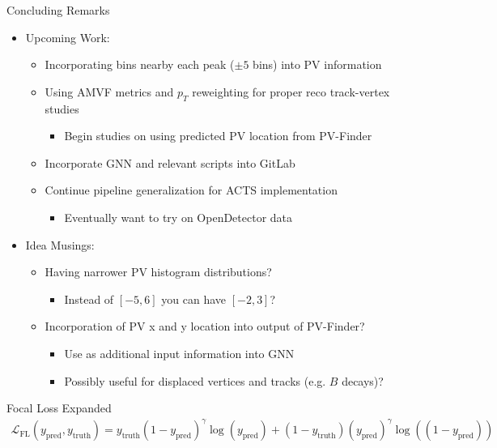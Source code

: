 \documentclass[xcolor=table,aspectratio=169]{beamer}
\begin{document}
\begin{frame}{Concluding Remarks}
    \begin{itemize}
        \item Upcoming Work:
        \begin{itemize}
            \item Incorporating bins nearby each peak (\(\pm 5\) bins) into PV information
            \item Using AMVF metrics and \(p_T\) reweighting for proper reco track-vertex studies
            \begin{itemize}
                \item Begin studies on using predicted PV location from PV-Finder
            \end{itemize}
            \item Incorporate GNN and relevant scripts into GitLab
            \item Continue pipeline generalization for ACTS implementation
            \begin{itemize}
                \item Eventually want to try on OpenDetector data
            \end{itemize}
        \end{itemize}
        \item Idea Musings:
        \begin{itemize}
            \item Having narrower PV histogram distributions?
            \begin{itemize}
                \item Instead of \(\left[-5,6\right]\) you can have \(\left[-2,3\right]\)?
            \end{itemize}
            \item Incorporation of PV x and y location into output of PV-Finder?
            \begin{itemize}
                \item Use as additional input information into GNN
                \item Possibly useful for displaced vertices and tracks (e.g. \(B\) decays)?
            \end{itemize}
        \end{itemize}
    \end{itemize}
\end{frame}

\begin{frame}{Focal Loss Expanded}
    \begin{align*}
        \mathcal{L}_{\text{FL}}(y_{\text{pred}}, y_{\text{truth}}) = y_{\text{truth}} (1-y_{\text{pred}})^\gamma \log(y_{\text{pred}}) + (1 - y_{\text{truth}}) (y_{\text{pred}})^\gamma \log ((1- y_{\text{pred}}))
    \end{align*}
\end{frame}
\end{document}
